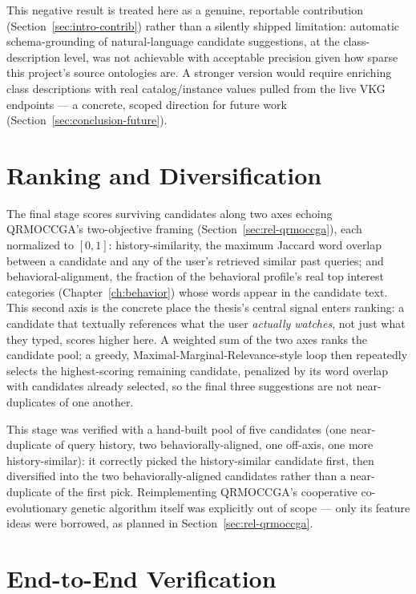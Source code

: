 \documentclass[11pt,a4paper,oneside]{book}
\begin{document}
This negative result is treated here as a genuine, reportable contribution
(Section~\ref{sec:intro-contrib}) rather than a silently shipped limitation: automatic
schema-grounding of natural-language candidate suggestions, at the class-description level, was not
achievable with acceptable precision given how sparse this project's source ontologies are. A
stronger version would require enriching class descriptions with real catalog/instance values pulled
from the live VKG endpoints --- a concrete, scoped direction for future work
(Section~\ref{sec:conclusion-future}).

\section{Ranking and Diversification}
\label{sec:rec-ranking}

The final stage scores surviving candidates along two axes echoing QRMOCCGA's two-objective framing
(Section~\ref{sec:rel-qrmoccga}), each normalized to $[0,1]$: history-similarity, the maximum
Jaccard word overlap between a candidate and any of the user's retrieved similar past queries; and
behavioral-alignment, the fraction of the behavioral profile's real top interest categories
(Chapter~\ref{ch:behavior}) whose words appear in the candidate text. This second axis is the
concrete place the thesis's central signal enters ranking: a candidate that textually references
what the user \emph{actually watches}, not just what they typed, scores higher here. A weighted sum
of the two axes ranks the candidate pool; a greedy, Maximal-Marginal-Relevance-style loop then
repeatedly selects the highest-scoring remaining candidate, penalized by its word overlap with
candidates already selected, so the final three suggestions are not near-duplicates of one another.

This stage was verified with a hand-built pool of five candidates (one near-duplicate of query
history, two behaviorally-aligned, one off-axis, one more history-similar): it correctly picked the
history-similar candidate first, then diversified into the two behaviorally-aligned candidates
rather than a near-duplicate of the first pick. Reimplementing QRMOCCGA's cooperative
co-evolutionary genetic algorithm itself was explicitly out of scope --- only its feature ideas were
borrowed, as planned in Section~\ref{sec:rel-qrmoccga}.

\section{End-to-End Verification}
\label{sec:rec-verification}
\end{document}
